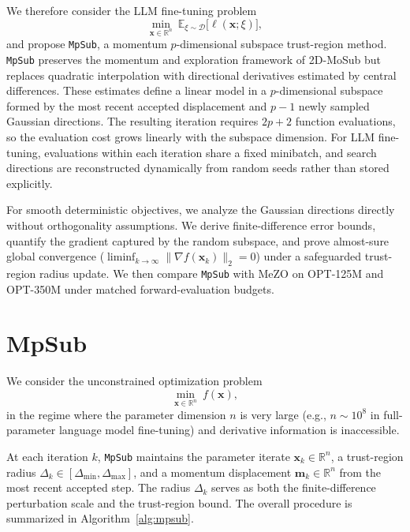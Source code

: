 \documentclass{siamart171218}
\newcommand{\bx}{\bm{x}}
\begin{document}
We therefore consider the LLM fine-tuning problem
\begin{equation}
\min_{\bx \in \mathbb{R}^n}
\ \mathbb{E}_{\xi\sim\mathcal D}
\bigl[\ell(\bx;\xi)\bigr],
\label{eq:ft_objective}
\end{equation}
and propose \texttt{MpSub}, a momentum $p$-dimensional subspace trust-region method. \texttt{MpSub} preserves the momentum and exploration framework of 2D-MoSub but replaces quadratic interpolation with directional derivatives estimated by central differences. These estimates define a linear model in a $p$-dimensional subspace formed by the most recent accepted displacement and $p-1$ newly sampled Gaussian directions. The resulting iteration requires $2p+2$ function evaluations, so the evaluation cost grows linearly with the subspace dimension. For LLM fine-tuning, evaluations within each iteration share a fixed minibatch, and search directions are reconstructed dynamically from random seeds rather than stored explicitly.

For smooth deterministic objectives, we analyze the Gaussian directions directly without orthogonality assumptions. We derive finite-difference error bounds, quantify the gradient captured by the random subspace, and prove almost-sure global convergence ($\liminf_{k\to\infty} \|\nabla f(\bx_k)\|_2 = 0$) under a safeguarded trust-region radius update. We then compare \texttt{MpSub} with MeZO on OPT-125M and OPT-350M under matched forward-evaluation budgets.

\section{MpSub}
\label{section:MpSub}

We consider the unconstrained optimization problem
\begin{equation}
\min_{\bx \in \mathbb{R}^n}\ f(\bx),
\label{eq:opt_problem}
\end{equation}
in the regime where the parameter dimension $n$ is very large (e.g., $n \sim 10^8$ in full-parameter language model fine-tuning) and derivative information is inaccessible.

At each iteration $k$, \texttt{MpSub} maintains the parameter iterate $\bx_k \in \mathbb{R}^n$, a trust-region radius $\Delta_k \in [\Delta_{\min}, \Delta_{\max}]$, and a momentum displacement $\bm m_k \in \mathbb{R}^n$ from the most recent accepted step. The radius $\Delta_k$ serves as both the finite-difference perturbation scale and the trust-region bound. The overall procedure is summarized in Algorithm~\ref{alg:mpsub}.
\end{document}
